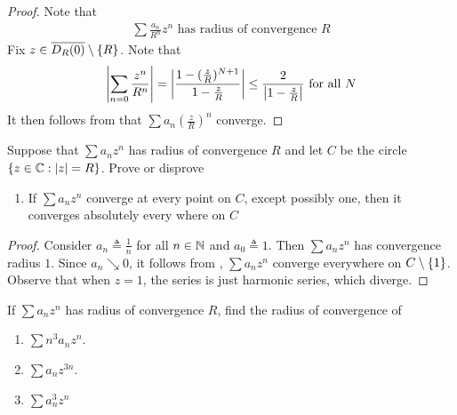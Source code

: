 \documentclass{report}
\begin{document}
\begin{proof}
Note that 
\begin{align*}
\sum \frac{a_n}{R^n}z^n\text{ has radius of convergence }R
\end{align*}
Fix $z\in \overline{D_R(0)}\setminus \{ R \}$. Note that 
\begin{align*}
\left|\sum_{n=0}\frac{z^n}{R^n}\right|= \left|\frac{1-(\frac{z}{R})^{N+1}}{1-\frac{z}{R}}\right| \leq \frac{2}{\left|1-\frac{z}{R}\right|}\text{ for all }N
\end{align*}
It then follows from   that $\sum a_n (\frac{z}{R})^n$ converge.
\end{proof}
\begin{question}{}{}
Suppose that $\sum a_nz^n$ has radius of convergence $R$ and let $C$ be the circle $\{ z\in\mathbb{C}:\left|z\right|=R \}$. Prove or disprove 
\begin{enumerate}[label=(\alph*)]
  \item If $\sum a_nz^n$ converge at every point on $C$, except possibly one, then it converges absolutely every where on  $C$
\end{enumerate}
\end{question}
\begin{proof}
  Consider $a_n\triangleq \frac{1}{n}$ for all $n\in\mathbb{N}$ and $a_0\triangleq 1$. Then $\sum a_nz^n$ has convergence radius $1$.  Since $a_n\searrow 0$, it follows from  , $\sum a_nz^n$ converge everywhere on $C\setminus \{ 1 \}$. Observe that when  $z=1$, the series is just harmonic series, which diverge.  
\end{proof}
\begin{question}{}{}
If $\sum a_nz^n$ has radius of convergence $R$, find the radius of convergence of 
\begin{enumerate}[label=(\alph*)]
  \item $\sum n^3 a_nz^n$. 
  \item $\sum a_nz^{3n}$.
  \item $\sum a_n^3 z^n$
\end{enumerate}
\end{question}
\end{document}
